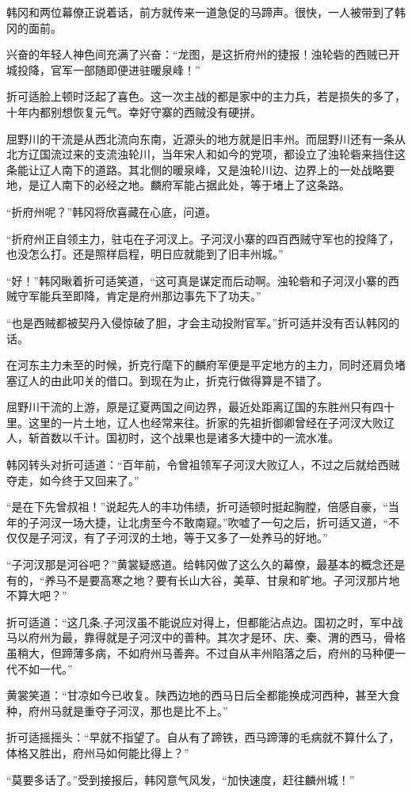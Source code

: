 韩冈和两位幕僚正说着话，前方就传来一道急促的马蹄声。很快，一人被带到了韩冈的面前。

兴奋的年轻人神色间充满了兴奋：“龙图，是这折府州的捷报！浊轮砦的西贼已开城投降，官军一部随即便进驻暖泉峰！”

折可适脸上顿时泛起了喜色。这一次主战的都是家中的主力兵，若是损失的多了，十年内都别想恢复元气。幸好守寨的西贼没有硬拼。

屈野川的干流是从西北流向东南，近源头的地方就是旧丰州。而屈野川还有一条从北方辽国流过来的支流浊轮川，当年宋人和如今的党项，都设立了浊轮砦来挡住这条能让辽人南下的道路。其北侧的暖泉峰，又是浊轮川边、边界上的一处战略要地，是辽人南下的必经之地。麟府军能占据此处，等于堵上了这条路。

“折府州呢？”韩冈将欣喜藏在心底，问道。

“折府州正自领主力，驻屯在子河汊上。子河汊小寨的四百西贼守军也的投降了，也没怎么打。还是照样启程，明日应就能到了旧丰州城。”

“好！”韩冈瞅着折可适笑道，“这可真是谋定而后动啊。浊轮砦和子河汊小寨的西贼守军能兵至即降，肯定是府州那边事先下了功夫。”

“也是西贼都被契丹入侵惊破了胆，才会主动投附官军。”折可适并没有否认韩冈的话。

在河东主力未至的时候，折克行麾下的麟府军便是平定地方的主力，同时还肩负堵塞辽人的由此叩关的借口。到现在为止，折克行做得算是不错了。

屈野川干流的上游，原是辽夏两国之间边界，最近处距离辽国的东胜州只有四十里。这里的一片土地，辽人也经常来往。折家的先祖折御卿曾经在子河汊大败辽人，斩首数以千计。国初时，这个战果也是诸多大捷中的一流水准。

韩冈转头对折可适道：“百年前，令曾祖领军子河汊大败辽人，不过之后就给西贼夺走，如今终于又回来了。”

“是在下先曾叔祖！”说起先人的丰功伟绩，折可适顿时挺起胸膛，倍感自豪，“当年的子河汊一场大捷，让北虏至今不敢南窥。”吹嘘了一句之后，折可适又道，“不仅仅是子河汊，有了子河汊的土地，等于又多了一处养马的好地。”

“子河汊那是河谷吧？”黄裳疑惑道。给韩冈做了这么久的幕僚，最基本的概念还是有的，“养马不是要高寒之地？要有长山大谷，美草、甘泉和旷地。子河汊那片地不算大吧？”

折可适道：“这几条,子河汊虽不能说应对得上，但都能沾点边。国初之时，军中战马以府州为最，靠得就是子河汊中的善种。其次才是环、庆、秦、渭的西马，骨格虽稍大，但蹄薄多病，不如府州马善奔。不过自从丰州陷落之后，府州的马种便一代不如一代。”

黄裳笑道：“甘凉如今已收复。陕西边地的西马日后全都能换成河西种，甚至大食种，府州马就是重夺子河汊，那也是比不上。”

折可适摇摇头：“早就不指望了。自从有了蹄铁，西马蹄薄的毛病就不算什么了，体格又胜出，府州马如何能比得上？”

“莫要多话了。”受到接报后，韩冈意气风发，“加快速度，赶往麟州城！”

